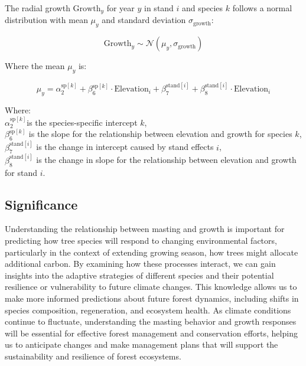 \documentclass[11pt,letter]{article}
\begin{document}
The radial growth \(\text{Growth}_y\) for year \(y\) in stand \(i\) and species \(k\) follows a normal distribution with mean \(\mu_y\) and standard deviation \(\sigma_{\text{growth}}\):

\[
\text{Growth}_y \sim \mathcal{N}(\mu_y, \sigma_{\text{growth}})
\]

Where the mean \(\mu_y\) is:

\[
\mu_y = \alpha_2^{\text{sp}[k]} + \beta_6^{\text{sp}[k]} \cdot \text{Elevation}_i + \beta_7^{\text{stand}[i]} + \beta_8^{\text{stand}[i]} \cdot \text{Elevation}_i
\]

Where:\\
\(\alpha_2^{\text{sp}[k]}\)is the species-specific intercept \(k\),\\
\(\beta_6^{\text{sp}[k]}\) is the slope for the relationship between elevation and growth for species \(k\),\\
\(\beta_7^{\text{stand}[i]}\) is the change in intercept caused by stand effects \(i\),\\
\(\beta_8^{\text{stand}[i]}\) is the change in slope for the relationship between elevation and growth for stand \(i\).


\subsection{Significance}
Understanding the relationship between masting and growth is important for predicting how tree species will respond to changing environmental factors, particularly in the context of extending growing season, how trees might allocate additional carbon. By examining how these processes interact, we can gain insights into the adaptive strategies of different species and their potential resilience or vulnerability to future climate changes. This knowledge allows us to make more informed predictions about future forest dynamics, including shifts in species composition, regeneration, and ecosystem health. As climate conditions continue to fluctuate, understanding the  masting behavior and growth responses will be essential for effective forest management and conservation efforts, helping us to anticipate changes and make management plans that will support the sustainability and resilience of forest ecosystems.\par
\end{document}
